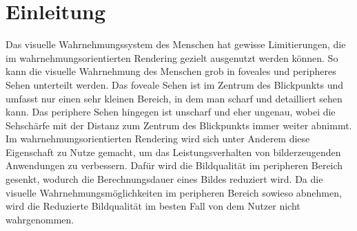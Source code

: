 \chapter{Einleitung}\label{chap::intro}
Das visuelle Wahrnehmungssystem des Menschen hat gewisse Limitierungen, die im wahrnehmungsorientierten Rendering gezielt ausgenutzt werden können.
So kann die visuelle Wahrnehmung des Menschen grob in foveales und peripheres Sehen unterteilt werden.
Das foveale Sehen ist im Zentrum des Blickpunkts und umfasst nur einen sehr kleinen Bereich, in dem man scharf und detailliert sehen kann.
Das periphere Sehen hingegen ist unscharf und eher ungenau, wobei die Sehschärfe mit der Distanz zum Zentrum  des Blickpunkts immer weiter abnimmt.
Im wahrnehmungsorientierten Rendering wird sich unter Anderem diese Eigenschaft zu Nutze gemacht, um das Leistungsverhalten von bilderzeugenden Anwendungen zu verbessern.
Dafür wird die Bildqualität im peripheren Bereich gesenkt, wodurch die Berechnungsdauer eines Bildes reduziert wird.
Da die visuelle Wahrnehmungsmöglichkeiten im peripheren Bereich sowieso abnehmen, wird die Reduzierte Bildqualität im besten Fall von dem Nutzer nicht wahrgenommen.